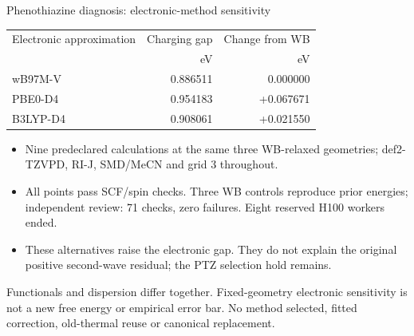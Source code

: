 \begin{frame}{Phenothiazine diagnosis: electronic-method sensitivity}
  \small
  \begin{center}
  \begin{tabular}{lrr}
    \toprule
    Electronic approximation & Charging gap & Change from WB \\
    & eV & eV \\
    \midrule
    wB97M-V & 0.886511 & 0.000000 \\
    PBE0-D4 & 0.954183 & +0.067671 \\
    B3LYP-D4 & 0.908061 & +0.021550 \\
    \bottomrule
  \end{tabular}
  \end{center}
  \begin{itemize}
    \item Nine predeclared calculations at the same three WB-relaxed geometries;
      def2-TZVPD, RI-J, SMD/MeCN and grid 3 throughout.
    \item All points pass SCF/spin checks. Three WB controls reproduce prior energies;
      independent review: 71 checks, zero failures. Eight reserved H100 workers ended.
    \item These alternatives raise the electronic gap. They do not explain the
      original positive second-wave residual; the PTZ selection hold remains.
  \end{itemize}
  \vfill\scriptsize Functionals and dispersion differ together. Fixed-geometry electronic
  sensitivity is not a new free energy or empirical error bar. No method selected,
  fitted correction, old-thermal reuse or canonical replacement.
\end{frame}
